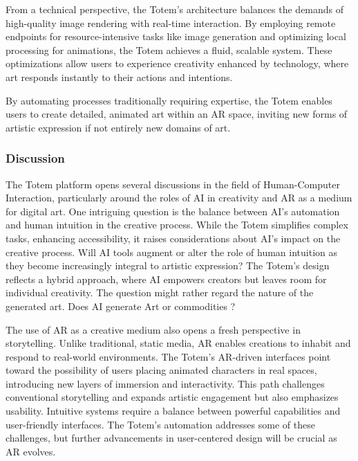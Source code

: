From a technical perspective, the Totem’s architecture balances the demands of high-quality image rendering with real-time interaction.
By employing remote endpoints for resource-intensive tasks like image generation and optimizing local processing for animations, the Totem achieves a fluid, scalable system.
These optimizations allow users to experience creativity enhanced by technology, where art responds instantly to their actions and intentions.

By automating processes traditionally requiring expertise, the Totem enables users to create detailed, animated art within an AR space, inviting new forms of artistic expression if not entirely new domains of art. 

\subsubsection{Discussion}
The Totem platform opens several discussions in the field of Human-Computer Interaction, particularly around the roles of AI in creativity and AR as a medium for digital art.
One intriguing question is the balance between AI’s automation and human intuition in the creative process.
While the Totem simplifies complex tasks, enhancing accessibility, it raises considerations about AI’s impact on the creative process.
Will AI tools augment or alter the role of human intuition as they become increasingly integral to artistic expression?
The Totem’s design reflects a hybrid approach, where AI empowers creators but leaves room for individual creativity.
The question might rather regard the nature of the generated art. Does AI generate Art or commodities ? 

The use of AR as a creative medium also opens a fresh perspective in storytelling.
Unlike traditional, static media, AR enables creations to inhabit and respond to real-world environments.
The Totem’s AR-driven interfaces point toward the possibility of users placing animated characters in real spaces, introducing new layers of immersion and interactivity.
This path challenges conventional storytelling and expands artistic engagement but also emphasizes usability.
Intuitive systems require a balance between powerful capabilities and user-friendly interfaces.
The Totem’s automation addresses some of these challenges, but further advancements in user-centered design will be crucial as AR evolves.

